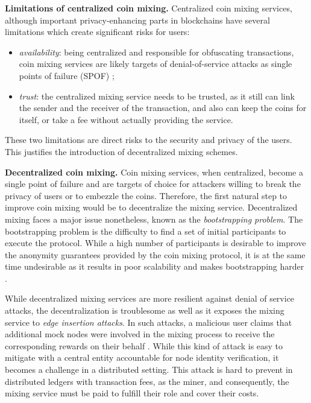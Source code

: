\textbf{Limitations of centralized coin mixing.} Centralized coin mixing services, although important privacy-enhancing parts in blockchains have several limitations which create significant risks for users:
\begin{itemize}
    \item \emph{availability}: being centralized and responsible for obfuscating transactions, coin mixing services are likely targets of denial-of-service attacks as single points of failure (SPOF) \cite{Sarfraz2019};
    \item \emph{trust}: the centralized mixing service needs to be trusted, as it still can link the sender and the receiver of the transaction, and also can keep the coins for itself, or take a fee without actually providing the service.
\end{itemize}

These two limitations are direct risks to the security and privacy of the users. This justifies the introduction of decentralized mixing schemes.

\textbf{Decentralized coin mixing.}
Coin mixing services, when centralized, become a single point of failure \cite{Sarfraz2019, Andola2021} and are targets of choice for attackers willing to break the privacy of users or to embezzle the coins. Therefore, the first natural step to improve coin mixing would be to decentralize the mixing service. Decentralized mixing faces a major issue nonetheless, known as the \emph{bootstrapping problem}\cite{Glaeser2022}. The bootstrapping problem is the difficulty to find a set of initial participants to execute the protocol.
While a high number of participants is desirable to improve
the anonymity guarantees provided by the coin mixing protocol, it is at the same time undesirable as it results in
poor scalability and makes bootstrapping harder \cite{Glaeser2022}. 

While decentralized mixing services are more resilient against denial of service attacks, the decentralization 
is troublesome as well as it exposes the mixing service to \emph{edge insertion attacks}.
In such attacks, a malicious user claims that additional mock nodes were involved in the mixing process to receive the corresponding rewards on their behalf \cite{Simoes2021}. While this kind of attack is easy to mitigate with a central entity accountable for node identity verification,
it becomes a challenge in a distributed setting. This attack is hard to prevent in distributed ledgers with transaction fees, as the miner, and consequently, the mixing service must be 
paid to fulfill their role and cover their costs.

